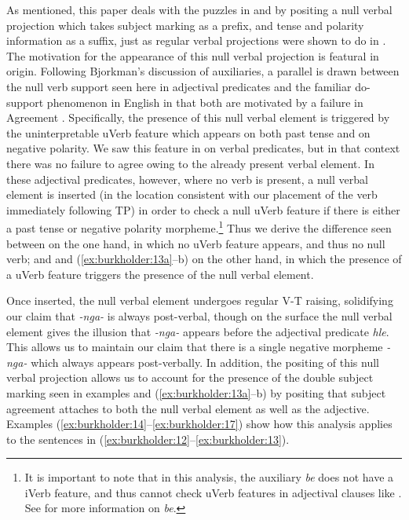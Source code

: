 \documentclass[output=paper]{langsci/langscibook}
\newcommand{\nga}[0]{\textit{-nga- }}
\newcommand{\bee}[0]{\textit{be }}
\begin{document}
As mentioned, this paper deals with the puzzles in  and  by positing a null verbal projection which takes subject marking as a prefix, and tense and polarity information as a suffix, just as regular verbal projections were shown to do in . The motivation for the appearance of this null verbal projection is featural in origin. Following Bjorkman's discussion of auxiliaries, a parallel is drawn between the null verb support seen here in adjectival predicates and the familiar do-support phenomenon in English in that both are motivated by a failure in Agreement \citep{Bjorkman2011}. Specifically, the presence of this null verbal element is triggered by the uninterpretable uVerb feature which appears on both past tense and on negative polarity. We saw this feature in  on verbal predicates, but in that context there was no failure to agree owing to the already present verbal element. In these adjectival predicates, however, where no verb is present, a null verbal element is inserted (in the location consistent with our placement of the verb immediately following TP) in order to check a null uVerb feature if there is either a past tense or negative polarity morpheme.\footnote{It is important to note that in this analysis, the auxiliary \bee does not have a iVerb feature, and thus cannot check uVerb features in adjectival clauses like . See for more information on \textit{be}.} Thus we derive the difference seen between  on the one hand, in which no uVerb feature appears, and thus no null verb; and  and (\ref{ex:burkholder:13a}--b) on the other hand, in which the presence of a uVerb feature triggers the presence of the null verbal element.

Once inserted, the null verbal element undergoes regular V-T raising, solidifying our claim that \nga is always post-verbal, though on the surface the null verbal element gives the illusion that \nga appears before the adjectival predicate \textit{hle}. This allows us to maintain our claim that there is a single negative morpheme \nga which always appears post-verbally. In addition, the positing of this null verbal projection allows us to account for the presence of the double subject marking seen in examples  and (\ref{ex:burkholder:13a}--b) by positing that subject agreement attaches to both the null verbal element as well as the adjective. Examples (\ref{ex:burkholder:14}--\ref{ex:burkholder:17}) show how this analysis applies to the sentences in (\ref{ex:burkholder:12}--\ref{ex:burkholder:13}).
\end{document}
